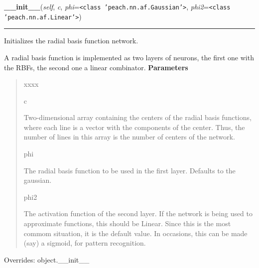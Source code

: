 \hspace{.8\funcindent}\begin{boxedminipage}{\funcwidth}

    \raggedright \textbf{\_\_init\_\_}(\textit{self}, \textit{c}, \textit{phi}={\tt {\textless}class 'peach.nn.af.Gaussian'{\textgreater}}, \textit{phi2}={\tt {\textless}class 'peach.nn.af.Linear'{\textgreater}})

    \vspace{-1.5ex}

    \rule{\textwidth}{0.5\fboxrule}
\setlength{\parskip}{2ex}

Initializes the radial basis function network.

A radial basis function is implemented as two layers of neurons, the
first one with the RBFs, the second one a linear combinator.
\setlength{\parskip}{1ex}
      \textbf{Parameters}
      \vspace{-1ex}

      \begin{quote}
        \begin{Ventry}{xxxx}

          \item[c]


Two-dimensional array containing the centers of the radial basis
functions, where each line is a vector with the components of the
center. Thus, the number of lines in this array is the number of
centers of the network.
          \item[phi]


The radial basis function to be used in the first layer. Defaults to
the gaussian.
          \item[phi2]


The activation function of the second layer. If the network is being
used to approximate functions, this should be Linear. Since this is
the most commom situation, it is the default value. In occasions,
this can be made (say) a sigmoid, for pattern recognition.
        \end{Ventry}

      \end{quote}

      Overrides: object.\_\_init\_\_

    \end{boxedminipage}

    \label{peach:nn:rbfn:RBFN:__call__}

